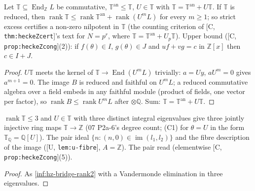 \begin{theorem}\label{inf:hz-count}
  \leanok
  Let $\mathbb T\subseteq\operatorname{End}_{\mathbb Z}L$ be commutative, $\mathbb T^{\mathrm{an}}\le\mathbb T$, $U\in\mathbb T$ with $\mathbb T=\mathbb T^{\mathrm{an}}+U\mathbb T$. If $\mathbb T$ is reduced, then
  $\operatorname{rank}\mathbb T\le\operatorname{rank}\mathbb T^{\mathrm{an}}+\operatorname{rank}(U^mL)$ for every $m\ge1$; so strict excess certifies a non-zero nilpotent in $\mathbb T$
  (the counting criterion of [C, \texttt{thm:heckeZcert}]'s text for $N=p^r$, where $\mathbb T=\mathbb T^{\mathrm{an}}+U_p\mathbb T$). Upper bound ([C, \texttt{prop:heckeZcong}](2)): if $f(\theta)\in I$,
  $g(\theta)\in J$ and $uf+vg=c$ in $\mathbb Z[x]$ then $c\in I+J$.
\end{theorem}
\begin{proof}
  \leanok
  $U\mathbb T$ meets the kernel of $\mathbb T\to\operatorname{End}(U^mL)$ trivially: $a=Uy$, $aU^m=0$ gives $a^{m+1}=0$. The image $B$ is reduced and faithful on $U^mL$; a reduced
  commutative algebra over a field embeds in any faithful module (product of fields, one vector per factor), so $\operatorname{rank}B\le\operatorname{rank}U^mL$ after $\otimes\mathbb Q$. Sum: $\mathbb T=\mathbb T^{\mathrm{an}}+U\mathbb T$.
\end{proof}

\begin{theorem}\label{inf:hz-three}
  \leanok
  $\operatorname{rank}\mathbb T\le3$ and $U\in\mathbb T$ with three distinct integral eigenvalues give three jointly injective ring maps $\mathbb T\to\mathbb Z$ (07 P2a-6's degree count; (C1) for $\theta=U$ in the form
  $\mathbb T_{\mathbb Q}=\mathbb Q[U]$). The pair ideal $\{n:(n,0)\in\operatorname{im}(l_1,l_2)\}$ and the fibre description of the image ([U, \texttt{lem:u-fibre}], $A=\mathbb Z$). The pair read (elementwise [C, \texttt{prop:heckeZcong}](5)).
\end{theorem}
\begin{proof}
  \leanok
  As \ref{inf:hz-bridge-rank2} with a Vandermonde elimination in three eigenvalues.
\end{proof}

